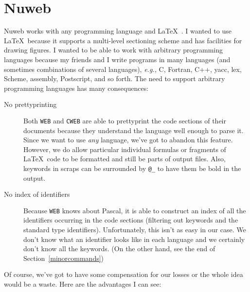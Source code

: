 \documentclass{report}
\begin{document}
\section{Nuweb}

Nuweb works with any programming language and \LaTeX~\cite{Lamport:LDP85}. I
wanted to use \LaTeX\ because it supports a multi-level sectioning
scheme and has facilities for drawing figures. I wanted to be able to
work with arbitrary programming languages because my friends and I
write programs in many languages (and sometimes combinations of
several languages), {\em e.g.,} C, Fortran, C++, yacc, lex, Scheme,
assembly, Postscript, and so forth. The need to support arbitrary
programming languages has many consequences:
\begin{description}
\item[No prettyprinting] Both \verb|WEB| and \verb|CWEB| are able to
  prettyprint the code sections of their documents because they
  understand the language well enough to parse it. Since we want to use
  {\em any\/} language, we've got to abandon this feature.
  However, we do allow particular individual formulas or fragments
  of \LaTeX\ code to be formatted and still be parts of output files.
  Also, keywords in scraps can be surrounded by \verb|@_| to 
  have them be bold in the output.
\item[No index of identifiers] Because \verb|WEB| knows about Pascal,
  it is able to construct an index of all the identifiers occurring in
  the code sections (filtering out keywords and the standard type
  identifiers). Unfortunately, this isn't as easy in our case. We don't
  know what an identifier looks like in each language and we certainly
  don't know all the keywords. (On the other hand, see the end of
  Section~\ref{minorcommands})
\end{description}
Of course, we've got to have some compensation for our losses or the
whole idea would be a waste. Here are the advantages I can see:
\end{document}
